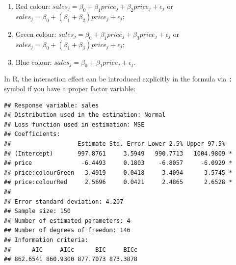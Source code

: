 \documentclass[
]{book}
\newenvironment{Shaded}{\begin{snugshade}}{\end{snugshade}}
\newcommand{\AttributeTok}[1]{\textcolor[rgb]{0.13,0.29,0.53}{#1}}
\newcommand{\CommentTok}[1]{\textcolor[rgb]{0.56,0.35,0.01}{\textit{#1}}}
\newcommand{\DecValTok}[1]{\textcolor[rgb]{0.00,0.00,0.81}{#1}}
\newcommand{\FunctionTok}[1]{\textcolor[rgb]{0.13,0.29,0.53}{\textbf{#1}}}
\newcommand{\NormalTok}[1]{#1}
\newcommand{\OtherTok}[1]{\textcolor[rgb]{0.56,0.35,0.01}{#1}}
\newcommand{\SpecialCharTok}[1]{\textcolor[rgb]{0.81,0.36,0.00}{\textbf{#1}}}
\newcommand{\StringTok}[1]{\textcolor[rgb]{0.31,0.60,0.02}{#1}}
\providecommand{\tightlist}{%
  \setlength{\itemsep}{0pt}\setlength{\parskip}{0pt}}
\theoremstyle{definition}
\theoremstyle{definition}
\theoremstyle{definition}
\theoremstyle{definition}
\theoremstyle{remark}
\begin{document}
\begin{enumerate}
\def\labelenumi{\arabic{enumi}.}
\tightlist
\item
  Red colour: \(sales_j = \beta_0 + \beta_1 price_j + \beta_2 price_j + \epsilon_j\) or \(sales_j = \beta_0 + (\beta_1 + \beta_2) price_j + \epsilon_j\);
\item
  Green colour: \(sales_j = \beta_0 + \beta_1 price_j + \beta_3 price_j + \epsilon_j\) or \(sales_j = \beta_0 + (\beta_1 + \beta_3) price_j + \epsilon_j\);
\item
  Blue colour: \(sales_j = \beta_0 + \beta_1 price_j + \epsilon_j\).
\end{enumerate}

In R, the interaction effect can be introduced explicitly in the formula via \texttt{:} symbol if you have a proper factor variable:

\begin{Shaded}
\end{Shaded}

\begin{verbatim}
## Response variable: sales
## Distribution used in the estimation: Normal
## Loss function used in estimation: MSE
## Coefficients:
##                   Estimate Std. Error Lower 2.5% Upper 97.5%  
## (Intercept)       997.8761     3.5949   990.7713   1004.9809 *
## price              -6.4493     0.1803    -6.8057     -6.0929 *
## price:colourGreen   3.4919     0.0418     3.4094      3.5745 *
## price:colourRed     2.5696     0.0421     2.4865      2.6528 *
## 
## Error standard deviation: 4.207
## Sample size: 150
## Number of estimated parameters: 4
## Number of degrees of freedom: 146
## Information criteria:
##      AIC     AICc      BIC     BICc 
## 862.6541 860.9300 877.7073 873.3878
\end{verbatim}
\end{document}
